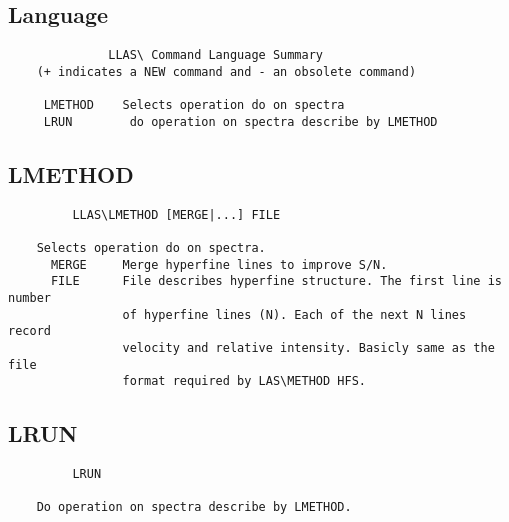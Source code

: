 \subsection{Language}
\begin{verbatim}
              LLAS\ Command Language Summary
    (+ indicates a NEW command and - an obsolete command)

     LMETHOD    Selects operation do on spectra
     LRUN        do operation on spectra describe by LMETHOD
\end{verbatim}
\subsection{LMETHOD}
\begin{verbatim}
         LLAS\LMETHOD [MERGE|...] FILE

    Selects operation do on spectra.
      MERGE     Merge hyperfine lines to improve S/N.
      FILE      File describes hyperfine structure. The first line is number
                of hyperfine lines (N). Each of the next N lines record
                velocity and relative intensity. Basicly same as the file
                format required by LAS\METHOD HFS.
\end{verbatim}
\subsection{LRUN}
\begin{verbatim}
         LRUN

    Do operation on spectra describe by LMETHOD.
\end{verbatim}
